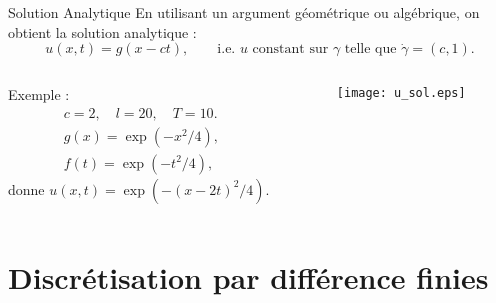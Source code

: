 \documentclass[aspectratio=169, french]{ISAE-Beamer}
\begin{document}
\begin{frame}{Solution Analytique}
En utilisant un argument géométrique ou algébrique, on obtient la solution analytique :
\begin{equation*}
	u(x, t) = g(x - ct), \qquad\text{i.e. $u$ constant sur $\gamma$ telle que $\dot{\gamma} = (c ,1)$.}
\end{equation*}

\begin{columns}
	\begin{column}{.45\textwidth}
	Exemple : 
	\begin{align*}
		c=2, \quad l=20, \quad T = 10. \\
		g(x) = \exp(-x^2/4), \\
		f(t) = \exp(-t^2/4),
	\end{align*}
	donne $u(x, t)= \exp(-(x-2t)^2/4)$.
	\end{column}
	\begin{column}{.5\textwidth}
		\begin{figure}
			\centering
			\texttt{[image: u\_sol.eps]}
		\end{figure}
	\end{column}
\end{columns}	

\end{frame}

\section{Discrétisation par différence finies}

\begin{frame}{}

\end{frame}
	
	
\end{document}
